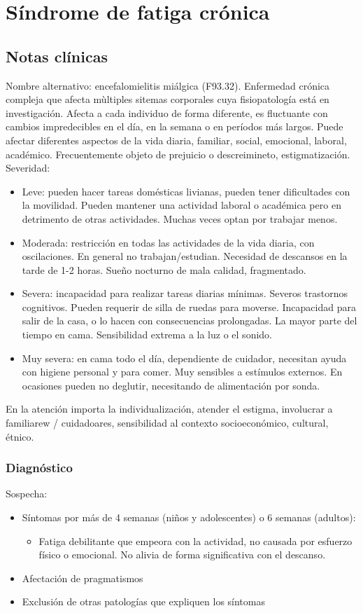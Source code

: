 \chapter{Síndrome de fatiga crónica}
\section*{Notas clínicas}
Nombre alternativo: encefalomielitis miálgica (F93.32).
Enfermedad crónica compleja que afecta mùltiples sitemas corporales cuya fisiopatología está en investigación. Afecta a cada individuo de forma diferente, es fluctuante con cambios impredecibles en el día, en la semana o en períodos más largos. Puede afectar diferentes aspectos de la vida diaria, familiar, social, emocional, laboral, académico.
Frecuentemente objeto de prejuicio o descreimineto, estigmatización.
Severidad:
\begin{itemize}
	\item Leve: pueden hacer tareas domésticas livianas, pueden tener dificultades con la movilidad. Pueden mantener una actividad laboral o académica pero en detrimento de otras actividades. Muchas veces optan por trabajar menos.
	\item Moderada: restricción en todas las actividades de la vida diaria, con oscilaciones. En general no trabajan/estudian. Necesidad de descansos en la tarde de 1-2 horas. Sueño nocturno de mala calidad, fragmentado.
	\item Severa: incapacidad para realizar tareas diarias mínimas. Severos trastornos cognitivos. Pueden requerir de silla de ruedas para moverse. Incapacidad para salir de la casa, o lo hacen con consecuencias prolongadas. La mayor parte del tiempo en cama. Sensibilidad extrema a la luz o el sonido.
	\item Muy severa: en cama todo el día, dependiente de cuidador, necesitan ayuda con higiene personal y para comer. Muy sensibles a estímulos externos. En ocasiones pueden no deglutir, necesitando de alimentación por sonda.
\end{itemize}
En la atención importa la individualización, atender el estigma, involucrar a familiarew / cuidadoares, sensibilidad al contexto socioeconómico, cultural, étnico.
\subsection*{Diagnóstico}
Sospecha:
\begin{itemize}
	\item Síntomas por más de 4 semanas (niños y adolescentes) o 6 semanas (adultos):
	\begin{itemize}
		\item Fatiga debilitante que empeora con la actividad, no causada por esfuerzo físico o emocional. No alivia de forma significativa con el descanso.
	\end{itemize}
	\item Afectación de pragmatismos
	\item Exclusión de otras patologías que expliquen los síntomas
\end{itemize}